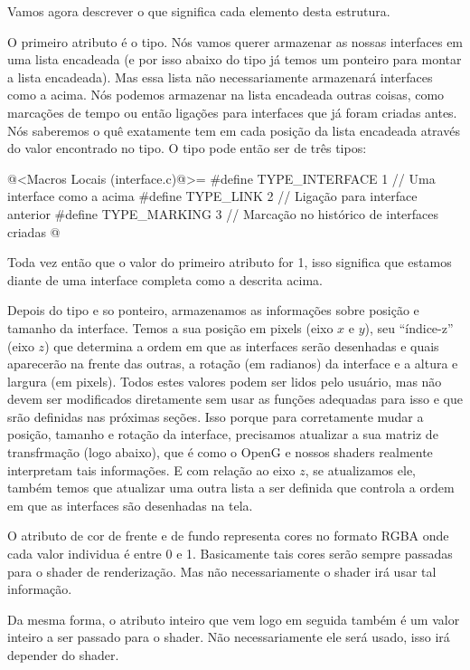 Vamos agora descrever o que significa cada elemento desta estrutura.

O primeiro atributo é o tipo. Nós vamos querer armazenar as nossas
interfaces em uma lista encadeada (e por isso abaixo do tipo já temos
um ponteiro para montar a lista encadeada). Mas essa lista não
necessariamente armazenará interfaces como a acima. Nós podemos
armazenar na lista encadeada outras coisas, como marcações de tempo ou
então ligações para interfaces que já foram criadas antes. Nós
saberemos o quê exatamente tem em cada posição da lista encadeada
através do valor encontrado no tipo. O tipo pode então ser de três
tipos:

\iniciocodigo
@<Macros Locais (interface.c)@>=
#define TYPE_INTERFACE 1 // Uma interface como a acima
#define TYPE_LINK      2 // Ligação para interface anterior
#define TYPE_MARKING   3 // Marcação no histórico de interfaces criadas
@
\fimcodigo

Toda vez então que o valor do primeiro atributo for 1, isso significa
que estamos diante de uma interface completa como a descrita acima.

Depois do tipo e so ponteiro, armazenamos as informações sobre posição
e tamanho da interface. Temos a sua posição em pixels (eixo $x$ e
$y$), seu ``índice-z'' (eixo $z$) que determina a ordem em que as
interfaces serão desenhadas e quais aparecerão na frente das outras, a
rotação (em radianos) da interface e a altura e largura (em
pixels). Todos estes valores podem ser lidos pelo usuário, mas não
devem ser modificados diretamente sem usar as funções adequadas para
isso e que srão definidas nas próximas seções. Isso porque para
corretamente mudar a posição, tamanho e rotação da interface,
precisamos atualizar a sua matriz de transfrmação (logo abaixo), que é
como o OpenG e nossos shaders realmente interpretam tais
informações. E com relação ao eixo $z$, se atualizamos ele, também
temos que atualizar uma outra lista a ser definida que controla a
ordem em que as interfaces são desenhadas na tela.

O atributo de cor de frente e de fundo representa cores no formato
RGBA onde cada valor individua é entre 0 e 1. Basicamente tais cores
serão sempre passadas para o shader de renderização. Mas não
necessariamente o shader irá usar tal informação.

Da mesma forma, o atributo inteiro que vem logo em seguida também é um
valor inteiro a ser passado para o shader. Não necessariamente ele
será usado, isso irá depender do shader.

